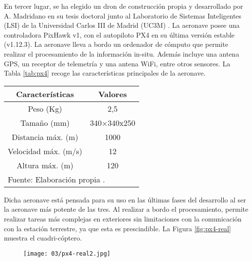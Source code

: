 \documentclass[../main.tex]{subfiles}
\begin{document}
En tercer lugar, se ha elegido un dron de construcción propia y desarrollado por A. Madridano en su tesis doctoral \cite{madridano2020arquitectura} junto al Laboratorio de Sistemas Inteligentes (LSI) de la Universidad Carlos III de Madrid (UC3M) \cite{lsi}. La aeronave posee una controladora PixHawk v1, con el autopiloto PX4 en su última versión estable (v1.12.3). La aeronave lleva a bordo un ordenador de cómputo que permite realizar el procesamiento de la información in-situ. Además incluye una antena GPS, un receptor de telemetría y una antena WiFi, entre otros sensores. La Tabla \ref{tab:px4} recoge las características principales de la aeronave.

\begin{table}[H]
	{\begin{tabular}{|c|c|}
		\hline
		\textbf{Características} & \textbf{Valores} \\
		\hline
		Peso (Kg)             & 2,5 \\  %
		\hline
        Tamaño (mm)          & 340×340x250 \\  %
        \hline
        Distancia máx. (m)   & 1000 \\  %
        \hline
        Velocidad máx. (m/s) & 12 \\  %
        \hline
        Altura máx. (m)      & 120 \\ %
        \hline
		\multicolumn{2}{l}{Fuente: Elaboración propia \cite{madridano2020arquitectura}.}
	\end{tabular}}
\end{table}

Dicha aeronave está pensada para su uso en las últimas fases del desarrollo al ser la aeronave más potente de las tres. Al realizar a bordo el procesamiento, permite realizar tareas más complejas en exteriores sin limitaciones con la comunicación con la estación terrestre, ya que esta es prescindible. La Figura \ref{fig:px4-real} muestra el cuadri-cóptero.

\begin{figure}[!ht]
 	{\texttt{[image: 03/px4-real2.jpg]}}
\end{figure}
\end{document}
